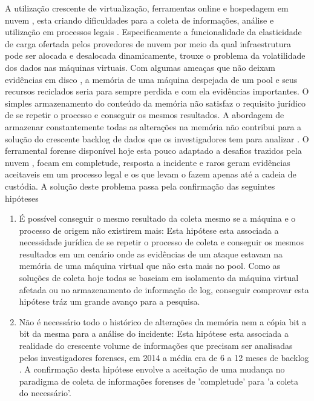 \documentclass[12pt,				%
	openright,			%
	oneside,			%
	a4paper,			%
	english,			%
	brazil				%
	]{abntex2}
\begin{document}
A utilização crescente de virtualização, ferramentas online e hospedagem em nuvem \cite{Amazon2016}, esta criando dificuldades para a coleta de informações, análise e utilização 
em processos legais \cite{Sharma2012}. Especificamente a funcionalidade da elasticidade de carga ofertada pelos provedores de nuvem por meio da qual infraestrutura pode ser 
alocada e desalocada dinamicamente, trouxe o problema da volatilidade dos dados nas máquinas virtuais. Com algumas ameaças que não deixam evidências em disco \cite{Rafique2013}, 
a memória de uma máquina despejada de um pool e seus recursos reciclados seria para sempre perdida e com ela evidências importantes. O simples armazenamento do conteúdo da memória
não satisfaz o requisito jurídico de se repetir o processo e conseguir os mesmos resultados. A abordagem de armazenar constantemente todas as alterações na memória não contribui 
para a solução do crescente backlog de dados que os investigadores tem para analizar \cite{Quick2014}. O ferramental forense disponível hoje esta pouco adaptado a desafios trazidos
pela nuvem \cite{Dykstra2012a}, focam em completude, resposta a incidente e raros geram evidências aceitaveis em um processo legal \cite{Reichert2015} e os que levam o fazem apenas
até a cadeia de custódia. A solução deste problema passa pela confirmação das seguintes hipóteses

\begin{enumerate}
 \item É possível conseguir o mesmo resultado da coleta mesmo se a máquina e o processo de origem não existirem mais: Esta hipótese esta associada a necessidade jurídica de se 
 repetir o processo de coleta e conseguir os mesmos resultados em um cenário onde as evidências de um ataque estavam na memória de uma máquina virtual que não esta mais no pool.
 Como as soluções de coleta hoje todas se baseiam em isolamento da máquina virtual afetada ou no armazenamento de informação de log, conseguir comprovar esta hipótese tráz um grande
 avanço para a pesquisa.
 \item Não é necessário todo o histórico de alterações da memória nem a cópia bit a bit da mesma para a análise do incidente: Esta hipótese esta associada a realidade do crescente
 volume de informações que precisam ser analisadas pelos investigadores forenses, em 2014 a média era de 6 a 12 meses de backlog \cite{Quick2014}. A confirmação desta hipótese
 envolve a aceitação de uma mudança no paradigma de coleta de informações forenses de 'completude' para 'a coleta do necessário'.
\end{enumerate}
\end{document}
